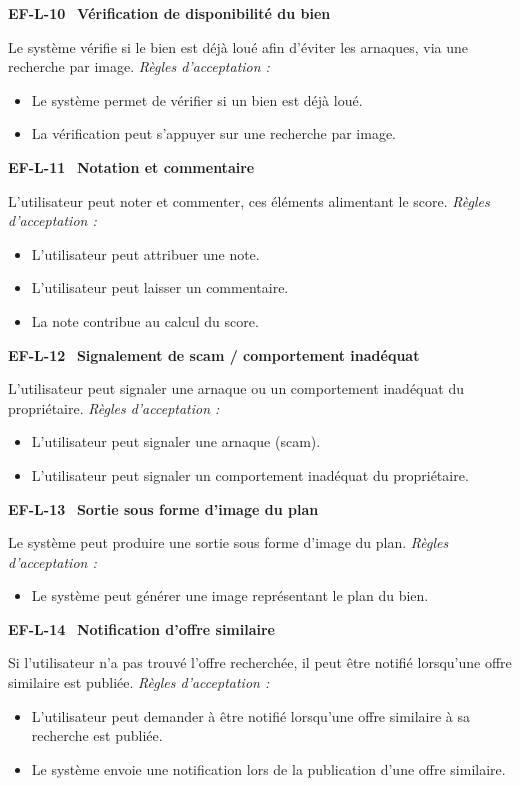 \documentclass[11pt,a4paper]{article}
\newcommand{\exigence}[2]{%
  \par\vspace{6pt}%
  \noindent\colorbox{light}{%
    \parbox{\dimexpr\textwidth-2\fboxsep}{%
      \textbf{\color{primary}#1} \textemdash\ \textbf{#2}%
    }%
  }\par\vspace{2pt}%
}
\newenvironment{acceptation}
  {\vspace{2pt}\noindent\textit{Règles d'acceptation :}
   \begin{itemize}[leftmargin=1.4em,itemsep=1pt,topsep=2pt]}
  {\end{itemize}\vspace{4pt}}
\begin{document}
\exigence{EF-L-10}{Vérification de disponibilité du bien}
Le système vérifie si le bien est déjà loué afin d'éviter les arnaques, via
une recherche par image.
\begin{acceptation}
  \item Le système permet de vérifier si un bien est déjà loué.
  \item La vérification peut s'appuyer sur une recherche par image.
\end{acceptation}

\exigence{EF-L-11}{Notation et commentaire}
L'utilisateur peut noter et commenter, ces éléments alimentant le score.
\begin{acceptation}
  \item L'utilisateur peut attribuer une note.
  \item L'utilisateur peut laisser un commentaire.
  \item La note contribue au calcul du score.
\end{acceptation}

\exigence{EF-L-12}{Signalement de scam / comportement inadéquat}
L'utilisateur peut signaler une arnaque ou un comportement inadéquat du
propriétaire.
\begin{acceptation}
  \item L'utilisateur peut signaler une arnaque (scam).
  \item L'utilisateur peut signaler un comportement inadéquat du propriétaire.
\end{acceptation}

\exigence{EF-L-13}{Sortie sous forme d'image du plan}
Le système peut produire une sortie sous forme d'image du plan.
\begin{acceptation}
  \item Le système peut générer une image représentant le plan du bien.
\end{acceptation}

\exigence{EF-L-14}{Notification d'offre similaire}
Si l'utilisateur n'a pas trouvé l'offre recherchée, il peut être notifié
lorsqu'une offre similaire est publiée.
\begin{acceptation}
  \item L'utilisateur peut demander à être notifié lorsqu'une offre similaire à sa recherche est publiée.
  \item Le système envoie une notification lors de la publication d'une offre similaire.
\end{acceptation}

\clearpage
\end{document}
